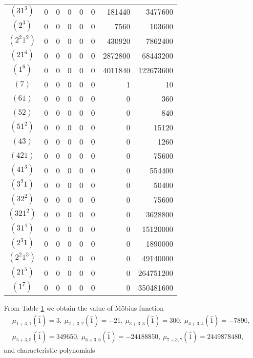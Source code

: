 \documentclass{wstmp}
\begin{document}
\begin{table}[htbp]
{\begin{tabular}{crrrrrrr}
$ ( 3 1 ^{ 3 } )$ & 0 & 0 & 0 & 0 & 0 & 181440
& 3477600 \\ 
$ ( 2 ^{ 3 } )$ & 0 & 0 & 0 & 0 & 0 & 7560 &
103600 \\ 
$ ( 2 ^{ 2 } 1 ^{ 2 } )$ & 0 & 0 & 0 & 0 & 0 &
430920 & 7862400 \\ 
$ ( 2 1 ^{ 4 } )$ & 0 & 0 & 0 & 0 & 0 & 2872800
& 68443200 \\ 
$ ( 1 ^{ 6 } )$ & 0 & 0 & 0 & 0 & 0 & 4011840
& 122673600 \\ 
\hline
$ ( 7 )$ & 0 & 0 & 0 & 0 & 0 & 1 & 10 \\ 
$ ( 6 1 )$ & 0 & 0 & 0 & 0 & 0 & 0 & 360 \\ 
$ ( 5 2 )$ & 0 & 0 & 0 & 0 & 0 & 0 & 840 \\ 
$ ( 5 1 ^{ 2 } )$ & 0 & 0 & 0 & 0 & 0 & 0 &
15120 \\ 
$ ( 4 3 )$ & 0 & 0 & 0 & 0 & 0 & 0 & 1260 \\

$ ( 4 2 1 )$ & 0 & 0 & 0 & 0 & 0 & 0 & 75600
\\ 
$ ( 4 1 ^{ 3 } )$ & 0 & 0 & 0 & 0 & 0 & 0 &
554400 \\ 
$ ( 3 ^{ 2 } 1 )$ & 0 & 0 & 0 & 0 & 0 & 0 &
50400 \\ 
$ ( 3 2 ^{ 2 } )$ & 0 & 0 & 0 & 0 & 0 & 0 &
75600 \\ 
$ ( 3 2 1 ^{ 2 } )$ & 0 & 0 & 0 & 0 & 0 & 0
& 3628800 \\ 
$ ( 3 1 ^{ 4 } )$ & 0 & 0 & 0 & 0 & 0 & 0 &
15120000 \\ 
$ ( 2 ^{ 3 } 1 )$ & 0 & 0 & 0 & 0 & 0 & 0 &
1890000 \\ 
$ ( 2 ^{ 2 } 1 ^{ 3 } )$ & 0 & 0 & 0 & 0 & 0 & 0
& 49140000 \\ 
$ ( 2 1 ^{ 5 } )$ & 0 & 0 & 0 & 0 & 0 & 0 &
264751200 \\ 
$ ( 1 ^{ 7 } )$ & 0 & 0 & 0 & 0 & 0 & 0 &
350481600
\\\hline
\end{tabular}
}
\label{tab1}
\end{table}
From Table \ref{tab1} we obtain the value of M\"obius function 
\begin{align*}
&\mu_{1+3,1}({\hat{1}})=
3, \ 
\mu_{2+3,2}({\hat{1}})=
-21, \ 
\mu_{3+3,3}({\hat{1}})=
300, \ 
\mu_{4+3,4}({\hat{1}})=
-7890, \\
&\mu_{5+3,5}({\hat{1}})=
349650, \ 
\mu_{6+3,6}({\hat{1}})=
-24188850,\ 
\mu_{7+3,7}({\hat{1}})=2449878480,
\end{align*}
and characteristic polynomials
\allowdisplaybreaks
\end{document}
